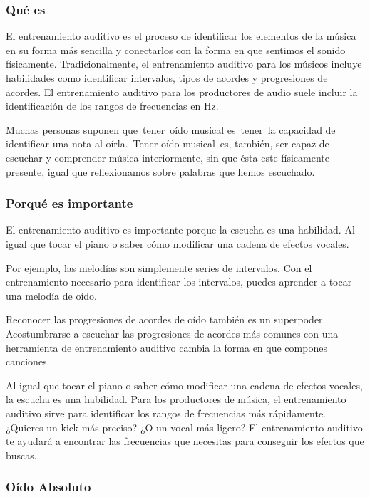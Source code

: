 \documentclass[12pt,twoside,titlepage]{report}
\begin{document}
\subsubsection{Qué es}

El entrenamiento auditivo es el proceso de identificar los elementos de la música en su forma más sencilla y conectarlos con la forma en que sentimos el sonido físicamente. Tradicionalmente, el entrenamiento auditivo para los músicos incluye habilidades como identificar intervalos, tipos de acordes y progresiones de acordes. El entrenamiento auditivo para los productores de audio suele incluir la identificación de los rangos de frecuencias en Hz.

Muchas personas suponen que tener oído musical es tener la capacidad de identificar una nota al oírla. Tener oído musical es, también, ser capaz de escuchar y comprender música interiormente, sin que ésta este físicamente presente, igual que reflexionamos sobre palabras que hemos escuchado.

\subsubsection{Porqué es importante}

El entrenamiento auditivo es importante porque la escucha es una habilidad. Al igual que tocar el piano o saber cómo modificar una cadena de efectos vocales.

Por ejemplo, las melodías son simplemente series de intervalos. Con el entrenamiento necesario para identificar los intervalos, puedes aprender a tocar una melodía de oído.

Reconocer las progresiones de acordes de oído también es un superpoder. Acostumbrarse a escuchar las progresiones de acordes más comunes con una herramienta de entrenamiento auditivo cambia la forma en que compones canciones.

Al igual que tocar el piano o saber cómo modificar una cadena de efectos vocales, la escucha es una habilidad.
Para los productores de música, el entrenamiento auditivo sirve para identificar los rangos de frecuencias más rápidamente. ¿Quieres un kick más preciso? ¿O un vocal más ligero? El entrenamiento auditivo te ayudará a encontrar las frecuencias que necesitas para conseguir los efectos que buscas.

\subsubsection{Oído Absoluto}
\end{document}
